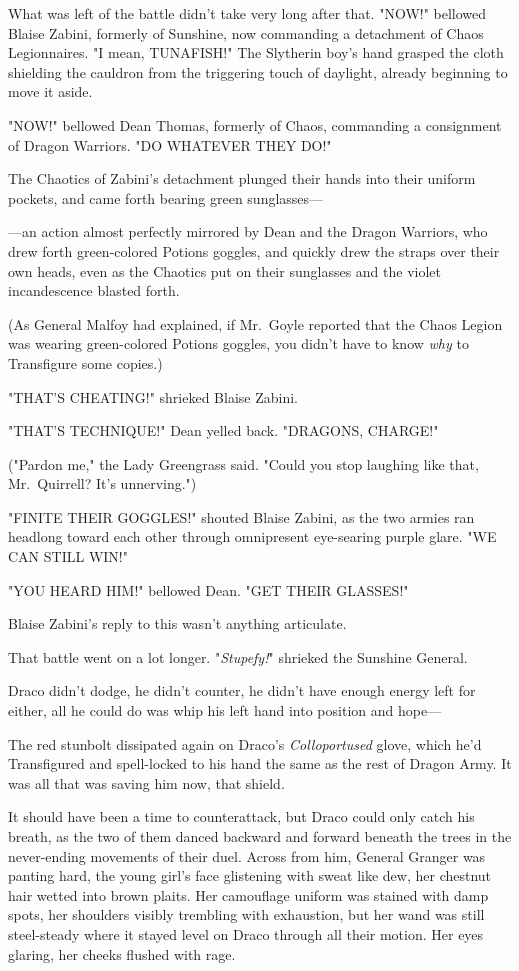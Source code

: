 What was left of the battle didn't take very long after that.
\sbreak
"NOW!" bellowed Blaise Zabini, formerly of Sunshine, now commanding a
detachment of Chaos Legionnaires. "I mean, TUNAFISH!" The Slytherin boy's hand
grasped the cloth shielding the cauldron from the triggering touch of daylight,
already beginning to move it aside.

"NOW!" bellowed Dean Thomas, formerly of Chaos, commanding a consignment of
Dragon Warriors. "DO WHATEVER THEY DO!"

The Chaotics of Zabini's detachment plunged their hands into their uniform
pockets, and came forth bearing green sunglasses—

—an action almost perfectly mirrored by Dean and the Dragon Warriors, who
drew forth green-colored Potions goggles, and quickly drew the straps over
their own heads, even as the Chaotics put on their sunglasses and the violet
incandescence blasted forth.

(As General Malfoy had explained, if Mr.~Goyle reported that the Chaos Legion
was wearing green-colored Potions goggles, you didn't have to know \emph{why}
to Transfigure some copies.)

"THAT'S CHEATING!" shrieked Blaise Zabini.

"THAT'S TECHNIQUE!" Dean yelled back. "DRAGONS, CHARGE!"

("Pardon me," the Lady Greengrass said. "Could you stop laughing like that,
Mr.~Quirrell? It's unnerving.")

"FINITE THEIR GOGGLES!" shouted Blaise Zabini, as the two armies ran headlong
toward each other through omnipresent eye-searing purple glare. "WE CAN STILL
WIN!"

"YOU HEARD HIM!" bellowed Dean. "GET THEIR GLASSES!"

Blaise Zabini's reply to this wasn't anything articulate.

That battle went on a lot longer.
\sbreak
"\emph{Stupefy!}" shrieked the Sunshine General.

Draco didn't dodge, he didn't counter, he didn't have enough energy left for
either, all he could do was whip his left hand into position and hope—

The red stunbolt dissipated again on Draco's \emph{Colloportused} glove, which
he'd Transfigured and spell-locked to his hand the same as the rest of Dragon
Army. It was all that was saving him now, that shield.

It should have been a time to counterattack, but Draco could only catch his
breath, as the two of them danced backward and forward beneath the trees in the
never-ending movements of their duel. Across from him, General Granger was
panting hard, the young girl's face glistening with sweat like dew, her
chestnut hair wetted into brown plaits. Her camouflage uniform was stained with
damp spots, her shoulders visibly trembling with exhaustion, but her wand was
still steel-steady where it stayed level on Draco through all their motion. Her
eyes glaring, her cheeks flushed with rage.

